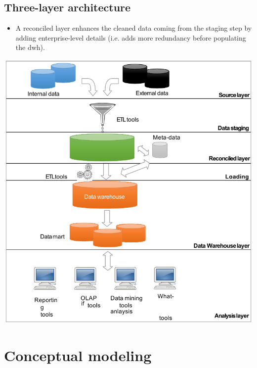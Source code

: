 \subsection{Three-layer architecture}
\begin{minipage}{0.45\textwidth}
    \begin{itemize}
        \item A reconciled layer enhances the cleaned data coming from the staging step by 
            adding enterprise-level details (i.e. adds more redundancy before populating the \ac{dwh}).
    \end{itemize}
\end{minipage}
\hfill
\begin{minipage}{0.5\textwidth}
    \centering
    \includegraphics[width=\linewidth]{img/_3layer_dwh.pdf}
\end{minipage}



\section{Conceptual modeling}


